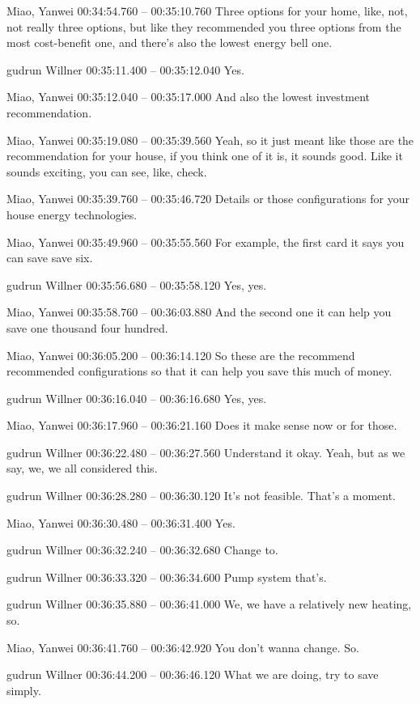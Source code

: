 {Miao, Yanwei 00:34:54.760 -- 00:35:10.760
Three options for your home, like, not, not really three options, but like they recommended you three options from the most cost-benefit one, and there's also the lowest energy bell one.

gudrun Willner 00:35:11.400 -- 00:35:12.040
Yes.

Miao, Yanwei 00:35:12.040 -- 00:35:17.000
And also the lowest investment recommendation.

Miao, Yanwei 00:35:19.080 -- 00:35:39.560
Yeah, so it just meant like those are the recommendation for your house, if you think one of it is, it sounds good. Like it sounds exciting, you can see, like, check.

Miao, Yanwei 00:35:39.760 -- 00:35:46.720
Details or those configurations for your house energy technologies.

Miao, Yanwei 00:35:49.960 -- 00:35:55.560
For example, the first card it says you can save save six.

gudrun Willner 00:35:56.680 -- 00:35:58.120
Yes, yes.

Miao, Yanwei 00:35:58.760 -- 00:36:03.880
And the second one it can help you save one thousand four hundred.

Miao, Yanwei 00:36:05.200 -- 00:36:14.120
So these are the recommend recommended configurations so that it can help you save this much of money.

gudrun Willner 00:36:16.040 -- 00:36:16.680
Yes, yes.

Miao, Yanwei 00:36:17.960 -- 00:36:21.160
Does it make sense now or for those.

gudrun Willner 00:36:22.480 -- 00:36:27.560
Understand it okay. Yeah, but as we say, we, we all considered this.

gudrun Willner 00:36:28.280 -- 00:36:30.120
It's not feasible. That's a moment.

Miao, Yanwei 00:36:30.480 -- 00:36:31.400
Yes.

gudrun Willner 00:36:32.240 -- 00:36:32.680
Change to.

gudrun Willner 00:36:33.320 -- 00:36:34.600
Pump system that's.

gudrun Willner 00:36:35.880 -- 00:36:41.000
We, we have a relatively new heating, so.

Miao, Yanwei 00:36:41.760 -- 00:36:42.920
You don't wanna change. So.

gudrun Willner 00:36:44.200 -- 00:36:46.120
What we are doing, try to save simply.

}
